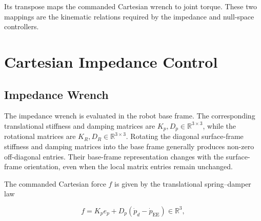 Its transpose maps the commanded Cartesian wrench to joint torque. These two
mappings are the kinematic relations required by the impedance and null-space
controllers.



\section{Cartesian Impedance Control}
\label{sec:cartesian_impedance_control}








\subsection{Impedance Wrench}
\label{subsec:impedance_wrench}

The impedance wrench is evaluated in the robot base frame. The corresponding
translational stiffness and damping matrices are
\mbox{\(K_p,D_p\in\mathbb{R}^{3\times3}\)}, while the rotational matrices are
\mbox{\(K_R,D_R\in\mathbb{R}^{3\times3}\)}. Rotating the diagonal
surface-frame stiffness and damping matrices into the base frame generally
produces non-zero off-diagonal entries. Their base-frame representation
changes with the surface-frame orientation, even when the local matrix entries
remain unchanged.

The commanded Cartesian force \mbox{\(f\)} is given by the translational spring--damper law
\mbox{\cite{Hogan1985,Mayr2024CartesianImpedance}}

\begin{equation}
f
=
K_pe_p
+
D_p
\left(
\dot{p}_d-\dot{p}_{\mathrm{EE}}
\right)
\in\mathbb{R}^3,
\label{eq:positional_impedance_force}
\end{equation}

